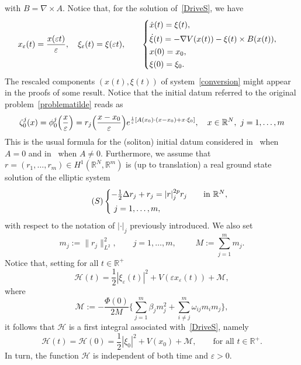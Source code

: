 \documentclass[11pt]{amsart}
\numberwithin{equation}{section}
\theoremstyle{definition}
\begin{document}
with $B=\nabla \times A$. Notice that, for the solution of~\eqref{DriveS}, we have
\begin{equation}
    \label{conversion}
x_{\varepsilon}(t)=\frac{x({\varepsilon} t)}{\varepsilon},\quad \xi_{\varepsilon}(t)=\xi({\varepsilon} t),\qquad
    \begin{cases}
        \dot x(t)=\xi(t), & \\
        \noalign{\vskip3pt}
        \dot \xi(t)=-\nabla V(x(t))-\xi(t)\times B(x(t)), & \\
        \noalign{\vskip1pt}
        x(0)=x_0, &\\
        \noalign{\vskip1pt}
        \xi(0)=\xi_0. &
    \end{cases}
\end{equation}
The rescaled components $(x(t),\xi(t))$ of system~\eqref{conversion} might appear
in the proofs of some result. Notice that the initial datum referred to the original
problem~\eqref{problematilde} reads as
\begin{equation*}
\zeta_0^j(x)=\phi_0^j\Big(\frac{x}{\varepsilon}\Big)=r_j\Big(\frac{x-x_0}{\varepsilon}\Big)
e^{\frac{{\rm i}}{\varepsilon}[A(x_0)\cdot(x-x_0)+x\cdot\xi_0]},\quad
x\in{{\mathbb R}}^N,\,\, j=1,\dots,m
\end{equation*}
This is the usual formula for the (soliton) initial datum considered in~\cite{bronski,Keerani2}
when $A=0$ and in~\cite{selvit,squa} when $A\neq 0$. Furthermore, we assume that $r=(r_1,\dots,r_m)\in
H^1({{\mathbb R}}^N,{{\mathbb R}}^m)$ is (up to translation) a real ground state solution
of the elliptic system
\begin{equation}
    \label{seMF}
\tag{$S$}
    \begin{cases}
        -\frac{1}{2}\Delta r_j+r_j=|r|^{2p}_jr_j  & \quad\text{in ${{\mathbb R}}^N$}, \\
        \noalign{\vskip3pt}
       \,\, j=1,\dots,m,
    \end{cases}
\end{equation}
with respect to the notation of $|\cdot|_j$ previously introduced. We also set
\begin{equation}\label{valueofm}
m_j:=\|r_j\|_{L^2}^2,\qquad j=1,\dots,m,\,\,\qquad
M:=\sum_{j=1}^m m_j.
\end{equation}
Notice that, setting for all $t\in{{\mathbb R}}^+$
\begin{equation}
\label{Hamilt} {\mathcal H}(t)=\frac{1}{2}|\xi_{\varepsilon}(t)|^2+V({\varepsilon} x_{\varepsilon}(t))+{\mathcal M},
\end{equation}
where
$$
{\mathcal M}:=-\frac{\Phi(0)}{2M}\Big\{\sum_{j=1}^m\beta_j m_j^2+\sum_{i\neq j}^m\omega_{ij}m_im_j\Big\},
$$
it follows that ${\mathcal H}$ is a first integral associated with~\eqref{DriveS}, namely
$$
{\mathcal H}(t)={\mathcal H}(0)=\frac{1}{2}|\xi_0|^2+V(x_0)+{\mathcal M},\qquad\text{for all $t\in{{\mathbb R}}^+$}.
$$
In turn, the function ${\mathcal H}$ is independent of both time and ${\varepsilon}>0$.
\end{document}
